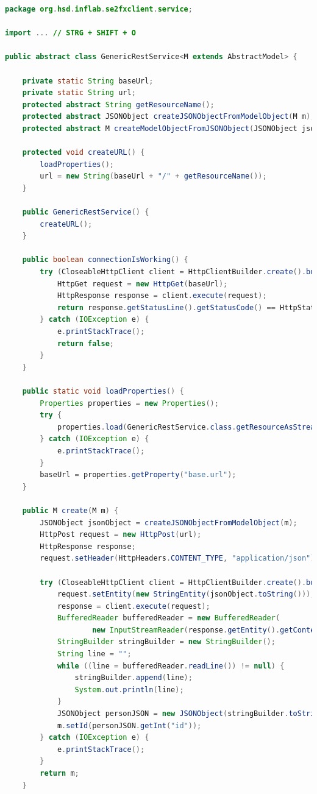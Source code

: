 \documentclass[11pt]{scrartcl}
\begin{document}
\begin{lstlisting}[language=java]
package org.hsd.inflab.se2fxclient.service;

import ... // STRG + SHIFT + O

public abstract class GenericRestService<M extends AbstractModel> {
    
    private static String baseUrl;
    private static String url;
    protected abstract String getResourceName();
    protected abstract JSONObject createJSONObjectFromModelObject(M m);
    protected abstract M createModelObjectFromJSONObject(JSONObject jsonObject);
    
    protected void createURL() {
        loadProperties();
        url = new String(baseUrl + "/" + getResourceName());
    }

    public GenericRestService() {
        createURL();
    }

    public boolean connectionIsWorking() {
        try (CloseableHttpClient client = HttpClientBuilder.create().build()) {
            HttpGet request = new HttpGet(baseUrl);
            HttpResponse response = client.execute(request);
            return response.getStatusLine().getStatusCode() == HttpStatus.SC_OK;
        } catch (IOException e) {
            e.printStackTrace();
            return false;
        }        
    }

    public static void loadProperties() {
        Properties properties = new Properties();
        try {
            properties.load(GenericRestService.class.getResourceAsStream("connections.properties"));
        } catch (IOException e) {
            e.printStackTrace();
        }
        baseUrl = properties.getProperty("base.url");
    }

    public M create(M m) {
        JSONObject jsonObject = createJSONObjectFromModelObject(m);
        HttpPost request = new HttpPost(url);
        HttpResponse response;
        request.setHeader(HttpHeaders.CONTENT_TYPE, "application/json");

        try (CloseableHttpClient client = HttpClientBuilder.create().build()) {
            request.setEntity(new StringEntity(jsonObject.toString()));
            response = client.execute(request);
            BufferedReader bufferedReader = new BufferedReader(
                    new InputStreamReader(response.getEntity().getContent()));
            StringBuilder stringBuilder = new StringBuilder();
            String line = "";
            while ((line = bufferedReader.readLine()) != null) {
                stringBuilder.append(line);
                System.out.println(line);
            }
            JSONObject personJSON = new JSONObject(stringBuilder.toString());
            m.setId(personJSON.getInt("id"));
        } catch (IOException e) {
            e.printStackTrace();
        }
        return m;
    }


\end{lstlisting}
\end{document}
